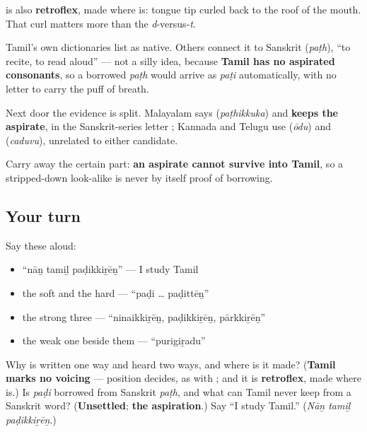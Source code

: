 \textbf{} is also \textbf{retroflex}, made where \textbf{} is: tongue tip curled back to the roof of the mouth. That curl matters more than the \emph{d}-versus-\emph{t}.

\begin{cousinweb}
Tamil's own dictionaries list \textbf{} as native. Others connect it to Sanskrit \textbf{} (\emph{paṭh}), \textquotedblleft{}to recite, to read aloud\textquotedblright{} — not a silly idea, because \textbf{Tamil has no aspirated consonants}, so a borrowed \emph{paṭh} would arrive as \emph{paṭi} automatically, with no letter to carry the puff of breath.

Next door the evidence is split. Malayalam says \textbf{} (\emph{paṭhikkuka}) and \textbf{keeps the aspirate}, in the Sanskrit-series letter \textbf{}; Kannada and Telugu use \textbf{} (\emph{ōdu}) and \textbf{} (\emph{caduvu}), unrelated to either candidate.

Carry away the certain part: \textbf{an aspirate cannot survive into Tamil}, so a stripped-down look-alike is never by itself proof of borrowing.
\end{cousinweb}

\subsection*{Your turn}
Say these aloud:

\begin{itemize}
\raggedright
  \item \textquotedblleft{}nāṉ tamiḻ paḍikkiṟēṉ\textquotedblright{} — I study Tamil
  \item the soft and the hard  — \textquotedblleft{}paḍi … paḍittēṉ\textquotedblright{}
  \item the strong three — \textquotedblleft{}ninaikkiṟēṉ, paḍikkiṟēṉ, pārkkiṟēṉ\textquotedblright{}
  \item the weak one beside them — \textquotedblleft{}purigiṟadu\textquotedblright{}
\end{itemize}

\begin{tcolorbox}[breakable,colback=teal!4,colframe=teal!35!black,title={Before you move on}]
Why is \textbf{} written one way and heard two ways, and where is it made? (\textbf{Tamil marks no voicing} — position decides, as with \textbf{}; and it is \textbf{retroflex}, made where \textbf{} is.) Is \emph{paḍi} borrowed from Sanskrit \emph{paṭh}, and what can Tamil never keep from a Sanskrit word? (\textbf{Unsettled}; \textbf{the aspiration}.) Say \textquotedblleft{}I study Tamil.\textquotedblright{} (\emph{Nāṉ tamiḻ paḍikkiṟēṉ}.)
\end{tcolorbox}
